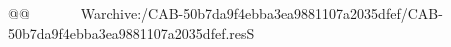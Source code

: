 @   @                                                          W   archive:/CAB-50b7da9f4ebba3ea9881107a2035dfef/CAB-50b7da9f4ebba3ea9881107a2035dfef.resS 